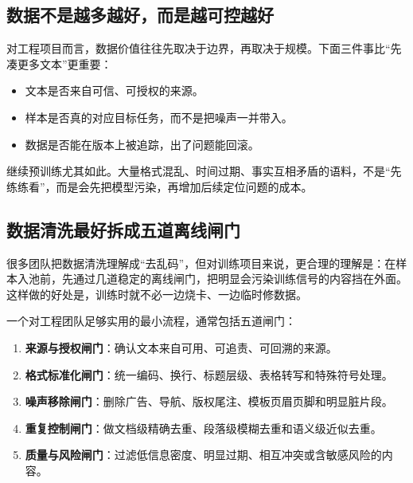 \subsection{数据不是越多越好，而是越可控越好}
对工程项目而言，数据价值往往先取决于边界，再取决于规模。下面三件事比“先凑更多文本”更重要：
\begin{itemize}
  \item 文本是否来自可信、可授权的来源。
  \item 样本是否真的对应目标任务，而不是把噪声一并带入。
  \item 数据是否能在版本上被追踪，出了问题能回滚。
\end{itemize}

继续预训练尤其如此。大量格式混乱、时间过期、事实互相矛盾的语料，不是“先练练看”，而是会先把模型污染，再增加后续定位问题的成本。

\subsection{数据清洗最好拆成五道离线闸门}
很多团队把数据清洗理解成“去乱码”，但对训练项目来说，更合理的理解是：在样本入池前，先通过几道稳定的离线闸门，把明显会污染训练信号的内容挡在外面。这样做的好处是，训练时就不必一边烧卡、一边临时修数据。

一个对工程团队足够实用的最小流程，通常包括五道闸门：
\begin{enumerate}
  \item \textbf{来源与授权闸门}：确认文本来自可用、可追责、可回溯的来源。
  \item \textbf{格式标准化闸门}：统一编码、换行、标题层级、表格转写和特殊符号处理。
  \item \textbf{噪声移除闸门}：删除广告、导航、版权尾注、模板页眉页脚和明显脏片段。
  \item \textbf{重复控制闸门}：做文档级精确去重、段落级模糊去重和语义级近似去重。
  \item \textbf{质量与风险闸门}：过滤低信息密度、明显过期、相互冲突或含敏感风险的内容。
\end{enumerate}

